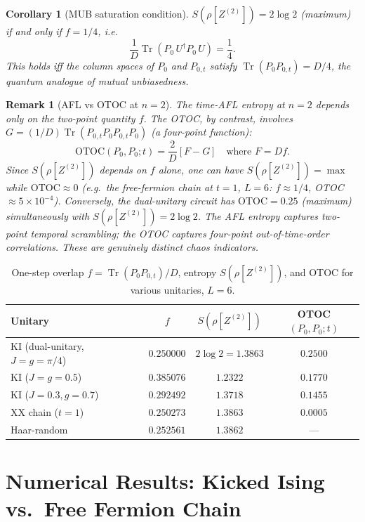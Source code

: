 \documentclass[12pt,a4paper]{article}
\newtheorem{corollary}[theorem]{Corollary}
\newtheorem{remark}[theorem]{Remark}
\begin{document}
\begin{corollary}[MUB saturation condition]
$S(\rho[Z^{(2)}])=2\log 2$ (maximum) if and only if $f=1/4$, i.e.\
\[
  \frac{1}{D}\operatorname{Tr}(P_0\,U^{\dagger}P_0\,U)=\frac{1}{4}.
\]
This holds iff the column spaces of $P_0$ and $P_{0,t}$ satisfy
$\operatorname{Tr}(P_0 P_{0,t})=D/4$, the quantum analogue of
\emph{mutual unbiasedness}.
\end{corollary}

\begin{remark}[AFL vs OTOC at $n=2$]
\label{rem:afl_otoc_n2}
The time-AFL entropy at $n=2$ depends only on the two-point quantity $f$.
The OTOC, by contrast, involves
$G=(1/D)\operatorname{Tr}(P_{0,t}P_0 P_{0,t} P_0)$ (a four-point function):
\[
  \mathrm{OTOC}(P_0,P_0;t)
  = \frac{2}{D}[F-G]
  \quad\text{where }F=Df.
\]
Since $S(\rho[Z^{(2)}])$ depends on $f$ alone, one can have $S(\rho[Z^{(2)}])=\max$
while $\mathrm{OTOC}\approx 0$ (e.g.\ the free-fermion chain at $t=1$, $L=6$:
$f\approx 1/4$, OTOC $\approx 5\times 10^{-4}$).  Conversely, the dual-unitary
circuit has $\mathrm{OTOC}=0.25$ (maximum) simultaneously with
$S(\rho[Z^{(2)}])=2\log 2$.  The AFL entropy captures two-point temporal
scrambling; the OTOC captures four-point out-of-time-order correlations.
These are genuinely distinct chaos indicators.
\end{remark}

\begin{table}[h]
\centering
\caption{One-step overlap $f=\operatorname{Tr}(P_0 P_{0,t})/D$, entropy $S(\rho[Z^{(2)}])$,
and OTOC for various unitaries, $L=6$.}
\begin{tabular}{lccc}
\hline
Unitary & $f$ & $S(\rho[Z^{(2)}])$ & OTOC$(P_0,P_0;t)$ \\
\hline
KI (dual-unitary, $J=g=\pi/4$) & $0.250000$ & $2\log 2=1.3863$ & $0.2500$ \\
KI ($J=g=0.5$) & $0.385076$ & $1.2322$ & $0.1770$ \\
KI ($J=0.3,g=0.7$) & $0.292492$ & $1.3718$ & $0.1455$ \\
XX chain ($t=1$) & $0.250273$ & $1.3863$ & $0.0005$ \\
Haar-random & $0.252561$ & $1.3862$ & --- \\
\hline
\end{tabular}
\label{tab:n2_afl}
\end{table}

\section{Numerical Results: Kicked Ising vs.\ Free Fermion Chain}
\label{sec:time_afl_numerics}
\end{document}
